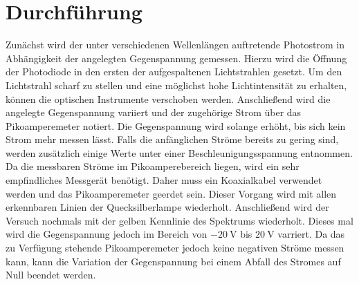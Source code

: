 
\section{Durchführung}
\label{sec:Durchführung}
Zunächst wird der unter verschiedenen Wellenlängen auftretende Photostrom in
Abhängigkeit der angelegten Gegenspannung gemessen. Hierzu wird die Öffnung der
Photodiode in den ersten der aufgespaltenen Lichtstrahlen gesetzt. Um den
Lichtstrahl scharf zu stellen und eine möglichst hohe Lichtintensität zu erhalten,
 können die optischen Instrumente verschoben werden.
 Anschließend wird die angelegte Gegenspannung variiert und der zugehörige Strom
 über das Pikoamperemeter notiert. Die Gegenspannung wird solange erhöht, bis sich
 kein Strom mehr messen lässt. Falls die anfänglichen Ströme bereits zu gering sind,
 werden zusätzlich einige Werte unter einer Beschleunigungsspannung entnommen.
 Da die messbaren Ströme im Pikoamperebereich liegen,
 wird ein sehr empfindliches Messgerät benötigt. Daher muss ein Koaxialkabel verwendet werden
 und das Pikoamperemeter geerdet sein. Dieser Vorgang wird mit allen erkennbaren
 Linien der Quecksilberlampe wiederholt.
 Anschließend wird der Versuch nochmals mit der gelben Kennlinie des Spektrums
 wiederholt. Dieses mal wird die Gegenspannung jedoch im Bereich von
 $\SI{-20}{\volt}$ bis $\SI{20}{\volt}$ varriert. Da das zu Verfügung stehende
 Pikoamperemeter jedoch keine negativen Ströme messen kann, kann die Variation der
 Gegenspannung bei einem Abfall des Stromes auf Null beendet werden.
